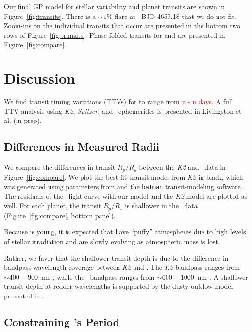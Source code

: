 \documentclass[twocolumn]{aastex631}
\begin{document}
Our final GP model for stellar variability and planet transits are shown in Figure~\ref{fig:transits}. There is a $\sim 1\%$ flare at \tess\ BJD 4659.18 that we do not fit. Zoom-ins on the individual transits that occur are presented in the bottom two rows of Figure~\ref{fig:transits}. Phase-folded transits for \planetc and \planetd are presented in Figure~\ref{fig:compare}.

\section{Discussion} \label{sec:discussion}

We find transit timing variations (TTVs) for \planetknown to range from \textcolor{red}{n - n days}. A full TTV analysis using \textit{K2}, \textit{Spitzer}, and \tess\ ephemerides is presented in Livingston et al. (in prep). 


\subsection{Differences in Measured Radii}

We compare the differences in transit $R_p/R_\star$ between the \textit{K2} and \tess\ data in Figure~\ref{fig:compare}. We plot the best-fit transit model from \textit{K2} in black, which was generated using parameters from \cite{David2019a} and the \texttt{batman} transit-modeling software \citep{Kreidberg15}. The residuals of the \tess\ light curve with our model and the \textit{K2} model are plotted as well. For each planet, the transit $R_p/R_\star$ is shallower in the \tess\ data (Figure~\ref{fig:compare}, bottom panel).

Because \sname is young, it is expected that \allplanets have ``puffy'' atmospheres due to high levels of stellar irradiation \citep{OwenWu2017} and are slowly evolving as atmospheric mass is lost. 

Rather, we favor that the shallower transit depth is due to the difference in bandpass wavelength coverage between \textit{K2} and \tess. The \textit{K2} bandpass ranges from $\sim 400-900$~nm \citep{Howell2014}, while the \tess\ bandpass ranges from $\sim 600-1000$~nm \citep{Ricker2015}. A shallower transit depth at redder wavelengths is supported by the dusty outflow model presented in \citep{wang19}.


\subsection{Constraining \planete's Period}
\end{document}
